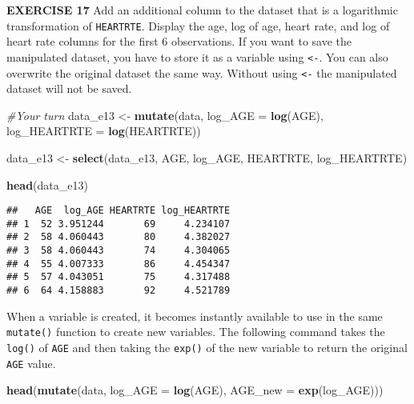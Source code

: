 \documentclass[
]{article}
\newenvironment{Shaded}{\begin{snugshade}}{\end{snugshade}}
\newcommand{\CommentTok}[1]{\textcolor[rgb]{0.56,0.35,0.01}{\textit{#1}}}
\newcommand{\DataTypeTok}[1]{\textcolor[rgb]{0.13,0.29,0.53}{#1}}
\newcommand{\KeywordTok}[1]{\textcolor[rgb]{0.13,0.29,0.53}{\textbf{#1}}}
\newcommand{\NormalTok}[1]{#1}
\newcommand{\StringTok}[1]{\textcolor[rgb]{0.31,0.60,0.02}{#1}}
\begin{document}
\textbf{EXERCISE 17} Add an additional column to the dataset that is a
logarithmic transformation of \texttt{HEARTRTE}. Display the age, log of
age, heart rate, and log of heart rate columns for the first 6
observations. If you want to save the manipulated dataset, you have to
store it as a variable using \texttt{\textless{}-}. You can also
overwrite the original dataset the same way. Without using
\texttt{\textless{}-} the manipulated dataset will not be saved.

\begin{Shaded}
\begin{Highlighting}[]
\CommentTok{#Your turn}
\NormalTok{data_e13 <-}\StringTok{ }\KeywordTok{mutate}\NormalTok{(data,}
                   \DataTypeTok{log_AGE =} \KeywordTok{log}\NormalTok{(AGE), }
                   \DataTypeTok{log_HEARTRTE =} \KeywordTok{log}\NormalTok{(HEARTRTE)) }

\NormalTok{data_e13 <-}\StringTok{ }\KeywordTok{select}\NormalTok{(data_e13, AGE, log_AGE, HEARTRTE, log_HEARTRTE)}

\KeywordTok{head}\NormalTok{(data_e13) }
\end{Highlighting}
\end{Shaded}

\begin{verbatim}
##   AGE  log_AGE HEARTRTE log_HEARTRTE
## 1  52 3.951244       69     4.234107
## 2  58 4.060443       80     4.382027
## 3  58 4.060443       74     4.304065
## 4  55 4.007333       86     4.454347
## 5  57 4.043051       75     4.317488
## 6  64 4.158883       92     4.521789
\end{verbatim}

When a variable is created, it becomes instantly available to use in the
same \texttt{mutate()} function to create new variables. The following
command takes the \texttt{log()} of \texttt{AGE} and then taking the
\texttt{exp()} of the new variable to return the original \texttt{AGE}
value.

\begin{Shaded}
\begin{Highlighting}[]
\KeywordTok{head}\NormalTok{(}\KeywordTok{mutate}\NormalTok{(data, }\DataTypeTok{log_AGE =} \KeywordTok{log}\NormalTok{(AGE), }\DataTypeTok{AGE_new =} \KeywordTok{exp}\NormalTok{(log_AGE)))}
\end{Highlighting}
\end{Shaded}
\end{document}
